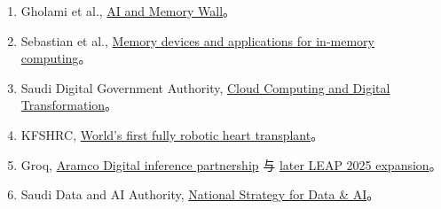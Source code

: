 \documentclass[a4paper]{article}
\begin{document}
\begin{enumerate}
  \item Gholami et al., \href{https://arxiv.org/abs/2403.14123}{AI and Memory Wall}。
  \item Sebastian et al., \href{https://www.nature.com/articles/s41565-020-0655-z}{Memory devices and applications for in-memory computing}。
  \item Saudi Digital Government Authority, \href{https://dga.gov.sa/sites/default/files/2024-08/Cloud%20Computing%20and%20its%20Role%20in%20Accelerating%20Digital%20Transformation%20and%20its%20Sustainable%20Impact%20in%20the%20Government%20Sector%20-%20V1.0.pdf}{Cloud Computing and Digital Transformation}。
  \item KFSHRC, \href{https://www.kfshrc.edu.sa/en/news/2024/09/kfshrc-pioneers-worlds-first-fully-robotic-heart-transplant}{World's first fully robotic heart transplant}。
  \item Groq, \href{https://groq.com/news_press/groq-and-aramco-digital-announce-partnership-to-establish-worlds-largest-inferenc-data-center-in-saudi-arabia}{Aramco Digital inference partnership} 与 \href{https://groq.com/news_press/saudi-arabia-announces-1-5b-expansion-to-fuel-ai-powered-economy-with-groq}{later LEAP 2025 expansion}。
  \item Saudi Data and AI Authority, \href{https://sdaia.gov.sa/en/SDAIA/about/Pages/Strategy.aspx}{National Strategy for Data \& AI}。
\end{enumerate}
\end{document}
